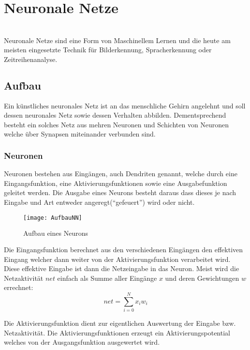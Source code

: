     \section{Neuronale Netze}
    \cite[Vgl. im Folgenden]{EinfuehrunginNN,WissensbasierteSysteme}\\
    Neuronale Netze sind eine Form von Maschinellem Lernen und die heute am meisten eingesetzte Technik für Bilderkennung, Spracherkennung oder Zeitreihenanalyse.
    
    \subsection*{Aufbau}
    Ein künstliches neuronales Netz ist an das menschliche Gehirn angelehnt und soll dessen neuronales Netz sowie dessen Verhalten abbilden. 
    Dementsprechend besteht ein solches Netz aus mehren Neuronen und Schichten von Neuronen welche über Synapsen miteinander verbunden sind.


    \subsubsection{Neuronen}
    Neuronen bestehen aus Eingängen, auch Dendriten genannt, welche durch eine Eingangsfunktion, eine Aktivierungsfunktionen sowie eine Ausgabefunktion geleitet werden.
    Die Ausgabe eines Neurons besteht daraus dass dieses je nach Eingabe und Art entweder angeregt("`gefeuert"') wird oder nicht.
    
    \begin{figure}[H]
        \centering
        \texttt{[image: AufbauNN]}
        \caption{Aufbau eines Neurons}
        \label{fig:AufbauNN}
    \end{figure}
    
    \noindent
    Die Eingangsfunktion berechnet aus den verschiedenen Eingängen den effektiven Eingang welcher dann weiter von der Aktivierungsfunktion verarbeitet wird.
    Diese effektive Eingabe ist dann die Netzeingabe in das Neuron.
    Meist wird die Netzaktivität \(net\) einfach als Summe aller Eingänge \(x\) und deren Gewichtungen \(w\) errechnet:
    \begin{equation}
        net = \sum_{i=0}^N x_i w_i
    \end{equation}
    \newline

    \noindent
    Die Aktivierungsfunktion dient zur eigentlichen Auswertung der Eingabe bzw. Netzaktivität.
    Die Aktivierungsfunktionen erzeugt ein Aktivierungspotential welches von der Ausgangsfunktion ausgewertet wird.
    \newline
    
